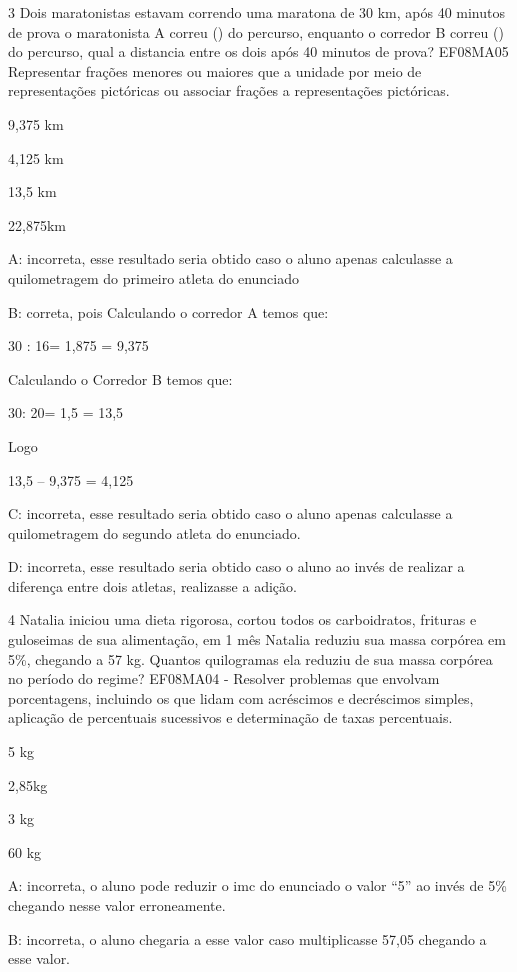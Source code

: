 \num{3} Dois maratonistas estavam correndo uma maratona de 30 km, após 40
minutos de prova o maratonista A correu () do percurso,
enquanto o corredor B correu () do percurso, qual a
distancia entre os dois após 40 minutos de prova? EF08MA05 Representar
frações menores ou maiores que a unidade por meio de representações
pictóricas ou associar frações a representações pictóricas.

\item 9,375 km
\item 4,125 km
\item 13,5 km
\item 22,875km

A: incorreta, esse resultado seria obtido caso o aluno apenas calculasse
a quilometragem do primeiro atleta do enunciado

B: correta, pois Calculando o corredor A temos que:

30 : 16= 1,875 = 9,375

Calculando o Corredor B temos que:

30: 20= 1,5 = 13,5

Logo

13,5 -- 9,375 = 4,125

C: incorreta, esse resultado seria obtido caso o aluno apenas calculasse
a quilometragem do segundo atleta do enunciado.

D: incorreta, esse resultado seria obtido caso o aluno ao invés de
realizar a diferença entre dois atletas, realizasse a adição.

\num{4} Natalia iniciou uma dieta rigorosa, cortou todos os carboidratos,
frituras e guloseimas de sua alimentação, em 1 mês Natalia reduziu sua
massa corpórea em 5\%, chegando a 57 kg. Quantos quilogramas ela reduziu
de sua massa corpórea no período do regime? EF08MA04 - Resolver
problemas que envolvam porcentagens, incluindo os que lidam com
acréscimos e decréscimos simples, aplicação de percentuais sucessivos e
determinação de taxas percentuais.

\item 5 kg
\item 2,85kg
\item 3 kg
\item 60 kg

A: incorreta, o aluno pode reduzir o imc do enunciado o valor ``5'' ao
invés de 5\% chegando nesse valor erroneamente.

B: incorreta, o aluno chegaria a esse valor caso multiplicasse 57,05
chegando a esse valor.

